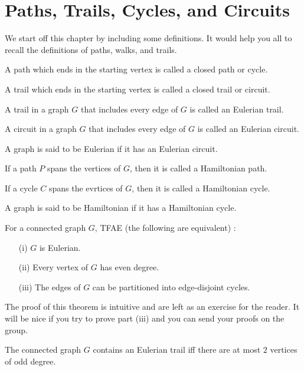 \documentclass[../basic_graph_theory.tex]{subfiles}
\begin{document}
\chapter{Paths, Trails, Cycles, and Circuits}
\setcounter{chapter}{4} %
\setcounter{section}{0}
\setcounter{equation}{0}
\setcounter{figure}{0}

We start off this chapter by including some definitions. It would help you all to recall the definitions of paths, walks, and trails.

\begin{defn}
    A path which ends in the starting vertex is called a closed path or cycle.
\end{defn}
\begin{defn}
    A trail which ends in the starting vertex is called a closed trail or circuit.
\end{defn}
\begin{defn}
    A trail in a graph $G$ that includes every edge of $G$ is called an Eulerian trail.
\end{defn}
\begin{defn}
    A circuit in a graph $G$ that includes every edge of $G$ is called an Eulerian circuit.
\end{defn}
\begin{defn}
    A graph is said to be Eulerian if it has an Eulerian circuit.
\end{defn}
\begin{defn}
    If a path $P$ spans the vertices of $G$, then it is called a Hamiltonian path.
\end{defn}
\begin{defn}
    If a cycle $C$ spans the evrtices of $G$, then it is called a Hamiltonian cycle.
\end{defn}
\begin{defn}
    A graph is said to be Hamiltonian if it has a Hamiltonian cycle.
\end{defn}

\begin{Thm}{}{}
    For a connected graph $G$, TFAE (the following are equivalent) :
    \begin{enumerate}
        \item[(i)] $G$ is Eulerian.
        \item[(ii)] Every vertex of $G$ has even degree.
        \item[(iii)] The edges of $G$ can be partitioned into edge-disjoint cycles.
    \end{enumerate}
\end{Thm}
The proof of this theorem is intuitive and are left as an exercise for the reader. It will be nice if you try to prove part (iii) and you can send your proofs on the group.
\begin{cor}
    The connected graph $G$ contains an Eulerian trail iff there are at most $2$ vertices of odd degree.
\end{cor}
\end{document}

